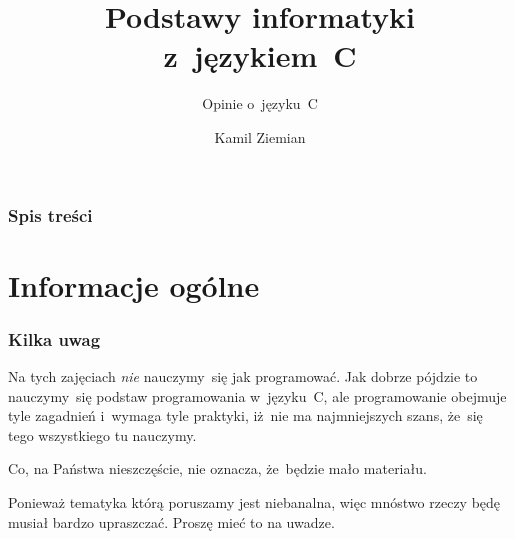 \documentclass[10pt,t]{beamer}
\title{Podstawy informatyki z~językiem~C}
\subtitle{Opinie o~języku~C}
\author{Kamil Ziemian}
\begin{document}





\RaggedRight





\maketitle





\begin{frame}
  \frametitle{Spis treści}


  \tableofcontents

\end{frame}





\section{Informacje ogólne}








\begin{frame}
  \frametitle{Kilka uwag}


  Na tych zajęciach \textit{nie} nauczymy~się jak programować. Jak dobrze
  pójdzie to nauczymy~się podstaw programowania w~języku~C, ale
  programowanie obejmuje tyle zagadnień i~wymaga tyle praktyki, iż~nie
  ma najmniejszych szans, że~się tego wszystkiego tu nauczymy.

  Co, na Państwa nieszczęście, nie oznacza, że~będzie mało materiału.

  Ponieważ tematyka którą poruszamy jest niebanalna, więc mnóstwo rzeczy
  będę musiał bardzo upraszczać. Proszę mieć to na uwadze.

\end{frame}
\end{document}

